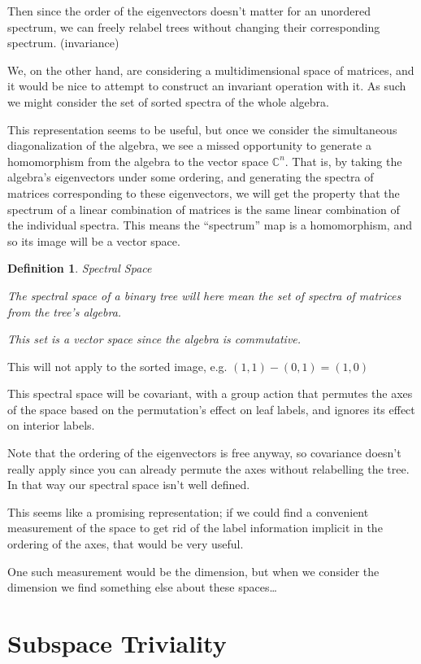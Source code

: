 \documentclass[10pt,a4paper]{report}
\newcommand{\C}{\mathbb{C}}
\newtheorem{definition}{Definition}
\begin{document}
Then since the order of the eigenvectors doesn't matter for an unordered spectrum, we can freely relabel
trees without changing their corresponding spectrum. (invariance)

We, on the other hand, are considering a multidimensional space of matrices,
and it would be nice to attempt to construct an invariant operation with it.
As such we might consider the set of sorted spectra of the whole algebra.

This representation seems to be useful, but once we consider the simultaneous
diagonalization of the algebra, we see a missed opportunity to generate a
homomorphism from the algebra to the vector space $\C^n$.
That is, by taking the algebra's eigenvectors under some ordering, and
generating the spectra of matrices corresponding to these eigenvectors, we will
get the property that the spectrum of a linear combination of matrices is the
same linear combination of the individual spectra.
This means the ``spectrum'' map is a homomorphism, and so its image will be a
vector space.

\begin{definition}Spectral Space

	The spectral space of a binary tree will here mean the set of spectra of
	matrices from the tree's algebra.

	This set is a vector space since the algebra is commutative.
\end{definition}


This will not apply to the sorted image, e.g. $(1, 1) - (0, 1) = (1, 0)$

This spectral space will be covariant, with a group action that permutes the axes of the space based on the permutation's effect on leaf labels, and ignores its effect on interior labels.

Note that the ordering of the eigenvectors is free anyway, so covariance doesn't really apply since you can already permute the axes without relabelling the tree.
In that way our spectral space isn't well defined.

This seems like a promising representation; if we could find a convenient
measurement of the space to get rid of the label information implicit in the ordering of the axes, that would be very
useful.

One such measurement would be the dimension, but when we consider the dimension
we find something else about these spaces\ldots

\section{Subspace Triviality}
\end{document}
